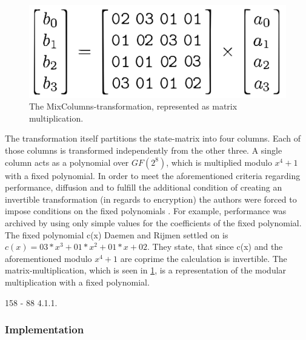 \begin{figure}
\centering
\includegraphics[scale = 0.2]{data/figures/mixcolumn.png}
\caption{The MixColumns-transformation, represented as matrix multiplication.}
\label{fig:mixcolumn}
\end{figure}

The transformation itself partitions the
state-matrix into four columns. Each of those columns is transformed
independently from the other three. A single column acts as a polynomial
over $GF(2^{8})$, which is multiplied modulo $x^4 + 1$ with a fixed polynomial. In
order to meet the aforementioned criteria regarding performance,
diffusion and to fulfill the additional condition of creating an
invertible transformation (in regards to encryption) the authors were
forced to impose conditions on the fixed polynomials \cite[p. 39]{rijndael}. For
example, performance was archived by using only simple values for the
coefficients of the fixed polynomial. The fixed polynomial c(x) Daemen
and Rijmen settled on is $c(x) = 03 * x^3 + 01 * x^2 + 01 * x + 02$. They
state, that since c(x) and the aforementioned modulo $x^4+1$ are coprime
the calculation is invertible. The matrix-multiplication, which is seen
in \ref{fig:mixcolumn}, is a representation of the modular multiplication with a
fixed polynomial.

158 - 88 4.1.1.

\hypertarget{implementation-4}{%
\subsubsection{Implementation}\label{implementation-4}}

